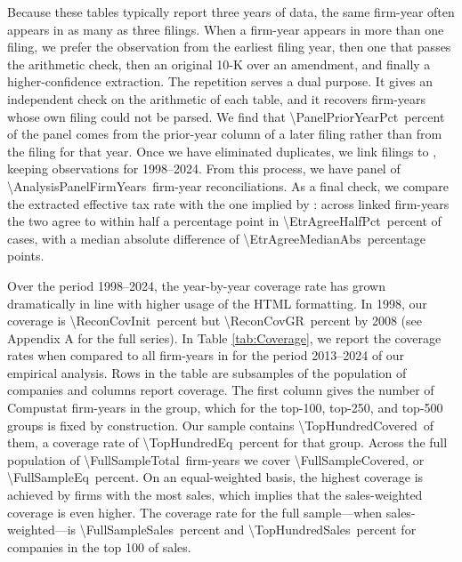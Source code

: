 \documentclass[11pt,letterpaper]{article}
\newcommand{\CountNum}[1]{\num[round-mode=places,round-precision=0]{#1}}
\newcommand{\ShareNum}[1]{\num[round-mode=places,round-precision=1]{#1}}
\newcommand{\RatioNum}[1]{\num[round-mode=places,round-precision=2]{#1}}
\begin{document}
Because these tables typically report three years of data, the same
firm-year often appears in as many as three filings. 
When a firm-year appears in more than one filing, we prefer the observation 
from the earliest filing year, then one that passes the arithmetic check, 
then an original 10-K over an amendment, and finally a higher-confidence extraction.
The repetition serves a dual purpose. It gives an independent check on the
arithmetic of each table, and it recovers firm-years whose own filing
could not be parsed. We find that \ShareNum{\PanelPriorYearPct}\ percent of the
panel comes from the prior-year column of a later filing rather than
from the filing for that year. Once we have eliminated duplicates, we link filings to
\citet{CompustatAnnual}, keeping observations for 1998--2024.
From this process, we have panel of
\CountNum{\AnalysisPanelFirmYears}\ firm-year reconciliations. 
As a final check, we compare the extracted effective
tax rate with the one implied by \citet{CompustatAnnual}: across
linked firm-years the two agree to within half a
percentage point in \ShareNum{\EtrAgreeHalfPct}\ percent of cases, with
a median absolute difference of \RatioNum{\EtrAgreeMedianAbs}\
percentage points. 

Over the period 1998--2024, the year-by-year coverage rate has
grown dramatically in line with higher usage of the HTML formatting.
In 1998, our coverage is
\ShareNum{\ReconCovInit}\ percent but 
\ShareNum{\ReconCovGR}\ percent by 2008 (see Appendix A for the full series).
In Table \ref{tab:Coverage},
we report the coverage rates when compared to all firm-years in \citet{CompustatAnnual}
for the period 2013--2024 of our empirical analysis.
Rows in the table are subsamples of the population of companies and
columns report coverage. The first column gives the number of
Compustat firm-years in the group, which for the top-100, top-250, and
top-500 groups is fixed by construction.  Our sample
contains \CountNum{\TopHundredCovered}\ of them, a coverage rate of
\ShareNum{\TopHundredEq}\ percent for that group. Across the full
population of \CountNum{\FullSampleTotal}\ firm-years we cover
\CountNum{\FullSampleCovered}, or \ShareNum{\FullSampleEq}\ percent. On an equal-weighted basis, 
the highest coverage
is achieved by firms with the most sales, which implies that the sales-weighted coverage
is even higher. The coverage rate for the full sample---when sales-weighted---is
\ShareNum{\FullSampleSales}\ percent and 
\ShareNum{\TopHundredSales}\ percent for companies in the top 100 of sales.
\end{document}
